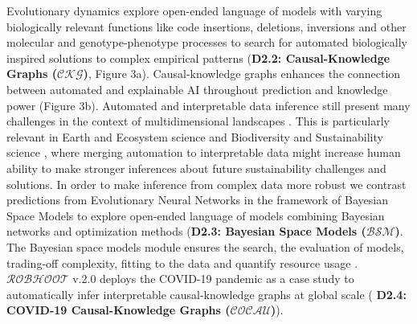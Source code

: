 \documentclass[11pt, a4paper]{article} %
\begin{document}
   Evolutionary dynamics explore open-ended language of models
   with varying biologically relevant functions like code insertions,
   deletions, inversions and other molecular and genotype-phenotype
   processes to search for automated biologically inspired solutions
   to complex empirical patterns ({\bf D2.2: Causal-Knowledge Graphs
     ($\mathcal{CKG}$)}, Figure 3a). Causal-knowledge graphs enhances
   the connection between automated and explainable AI throughout
   prediction and knowledge power (Figure 3b). Automated and
   interpretable data inference still present many challenges in the
   context of multidimensional landscapes
   \citep{OHare2015,Cranmer2019}. This is particularly relevant in
   Earth and Ecosystem science and Biodiversity and Sustainability
   science \citep{Reichstein}, where merging automation to
   interpretable data might increase human ability to make stronger
   inferences about future sustainability challenges and solutions. In
   order to make inference from complex data more robust we contrast
   predictions from Evolutionary Neural Networks in the framework of
   Bayesian Space Models to explore open-ended language of models
   combining Bayesian networks and optimization methods ({\bf D2.3:
     Bayesian Space Models ($\mathcal{BSM}$)}. The Bayesian space
   models module ensures the search, the evaluation of models,
   trading-off complexity, fitting to the data and quantify resource
   usage \citep{Guimera2020,Steinruecken}. $\mathcal{ROBHOOT}$ v.2.0
   deploys the COVID-19 pandemic as a case study to automatically
   infer interpretable causal-knowledge graphs at global scale ({\bf
     D2.4: COVID-19 Causal-Knowledge Graphs ($\mathcal{COCAU}$)}).
\end{document}

